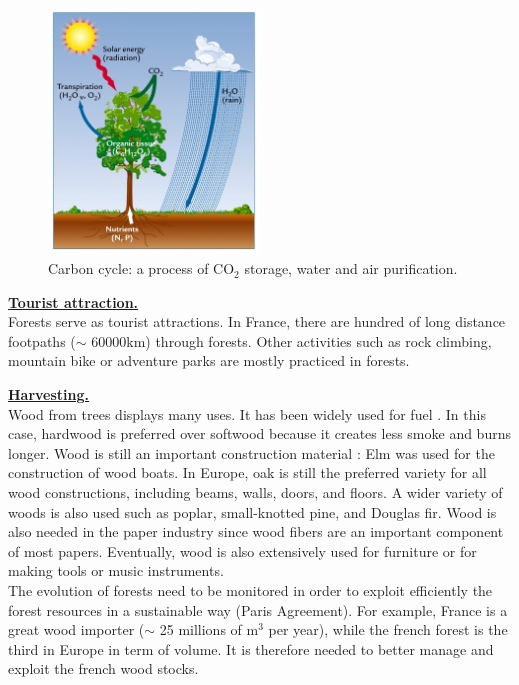 \begin{figure}[htbp]
\begin{center}
\includegraphics[width=0.5\textwidth]{Figures/carbon_cycle}
\caption{Carbon cycle: a process of CO$_{2}$ storage, water and air purification.}
\label{fig:carbon_cycle}
\end{center}
\end{figure}

\textbf{\underline{Tourist attraction.}}\\
Forests serve as tourist attractions. In France, there are hundred of long distance footpaths ($\sim$ 60000km) through forests. Other activities such as rock climbing, mountain bike or adventure parks are mostly practiced in forests.

\textbf{\underline{Harvesting.}} \\
Wood from trees displays many uses. It has been widely used for fuel \citep{sterrett1994alternative}. In this case, hardwood is preferred over softwood because it creates less smoke and burns longer. 
Wood is still an important construction material \citep{ramage2017wood}: Elm was used for the construction of wood boats. In Europe, oak is still the preferred variety for all wood constructions, including beams, walls, doors, and floors. A wider variety of woods is also used such as poplar, small-knotted pine, and Douglas fir.
Wood is also needed in the paper industry since wood fibers are an important component of most papers. Eventually, wood is also extensively used for furniture or for making tools or music instruments. \\

The evolution of forests need to be monitored in order to exploit efficiently the forest resources in a sustainable way (Paris Agreement). For example, France is a great wood importer ($\sim$ 25 millions of m$^{3}$ per year), while the french forest is the third in Europe in term of volume. It is therefore needed to better manage and exploit the french wood stocks.

